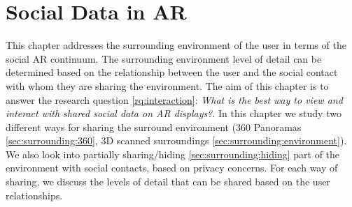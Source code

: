 \chapter{Social Data in AR} %
\label{ch:data} %

This chapter addresses the surrounding environment of the user in terms of the social AR continuum. The surrounding environment level of detail can be determined based on the relationship between the user and the social contact with whom they are sharing the environment. The aim of this chapter is to answer the research question \ref{rq:interaction}: \textit{What is the best way to view and interact with shared social data on AR displays?}. In this chapter we study two different ways for sharing the surround environment (360 Panoramas \ref{sec:surrounding:360}, 3D scanned surroundings \ref{sec:surrounding:environment}). We also look into partially sharing/hiding \ref{sec:surrounding:hiding} part of the environment with social contacts, based on privacy concerns. For each way of sharing, we discuss the levels of detail that can be shared based on the user relationships. 





